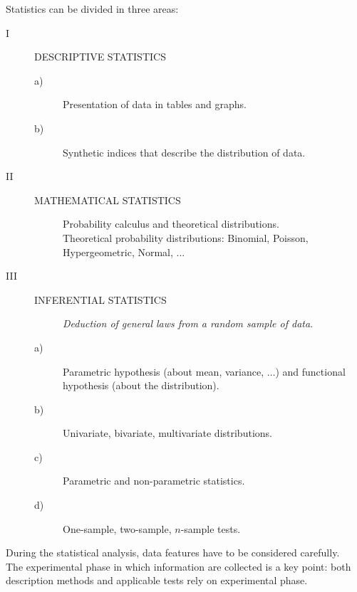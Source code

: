 
\begin{frame}
  \begin{scriptsize}
    Statistics can be divided in three areas:
    \vspace{.25cm}
    \begin{description}
      \item [I] DESCRIPTIVE STATISTICS
      \begin{description}
        \item [a)] Presentation of data in tables and graphs.
        \item [b)] Synthetic indices that describe the distribution of data.
      \end{description}
      \vspace{.25cm}
      \item [II] MATHEMATICAL STATISTICS
      \begin{description}
        \item [] Probability calculus and theoretical distributions. \\
          Theoretical probability distributions: Binomial, Poisson, Hypergeometric, Normal, ...
      \end{description}
      \vspace{.25cm}
      \item [III] INFERENTIAL STATISTICS
      \begin{description}
        \item []\textit{Deduction of general laws from a random sample of data}.
        \item [a)] Parametric hypothesis (about mean, variance, $\dots$) and functional hypothesis (about the distribution).
        \item [b)] Univariate, bivariate, multivariate distributions.
        \item [c)] Parametric and non-parametric statistics.
        \item [d)] One-sample, two-sample, $n$-sample tests.
      \end{description}
    \end{description}
  \end{scriptsize}
\end{frame}




\begin{frame}
  \vspace*{.75cm}
  During the statistical analysis, data features have to be considered carefully. \\
  \vspace*{.75cm}
  The experimental phase in which information are collected is a key point: both description methods and applicable tests rely on experimental phase. \\
\end{frame}

